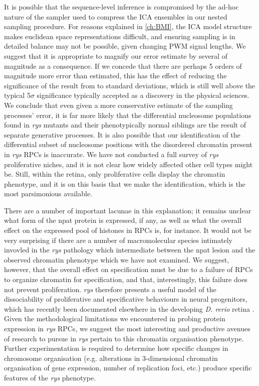 It is possible that the sequence-level inference is compromised by the ad-hoc nature of the sampler used to compress the ICA ensembles in our nested sampling procedure. For reasons explained in \autoref{ch:BMI}, the ICA model structure makes euclidean space representations difficult, and ensuring sampling is in detailed balance may not be possible, given changing PWM signal lengths. We suggest that it is appropriate to magnify our error estimate by several of magnitude as a consequence. If we concede that there are perhaps 5 orders of magnitude more error than estimated, this has the effect of reducing the significance of the result from to standard deviations, which is still well above the typical 5$\sigma$ significance typically accepted as a discovery in the physical sciences. We conclude that even given a more conservative estimate of the sampling processes' error, it is far more likely that the differential nucleosome populations found in \textit{rys} mutants and their phenotypically normal siblings are the result of separate generative processes. It is also possible that our identification of the differential subset of nucleosome positions with the disordered chromatin present in \textit{rys} RPCs is inaccurate. We have not conducted a full survey of \textit{rys} proliferative niches, and it is not clear how widely affected other cell types might be. Still, within the retina, only proliferative cells display the chromatin phenotype, and it is on this basis that we make the identification, which is the most parsimonious available. 

There are a number of important lacunae in this explanation; it remains unclear what form of the npat protein is expressed, if any, as well as what the overall effect on the expressed pool of histones in RPCs is, for instance. It would not be very surprising if there are a number of macromolecular species intimately invovled in the \textit{rys} pathology which intermediate between the npat lesion and the observed chromatin phenotype which we have not examined. We suggest, however, that the overall effect on specification must be due to a failure of RPCs to organize chromatin for specification, and that, interestingly, this failure does not prevent proliferation. \textit{rys} therefore presents a useful model of the dissociability of proliferative and specificative behaviours in neural progenitors, which has recently been documented elsewhere in the developing \textit{D. rerio} retina \cite{Engerer2017}. Given the methodological limitations we encountered in probing protein expression in \textit{rys} RPCs, we suggest the most interesting and productive avenues of research to pursue in \textit{rys} pertain to this chromatin organisation phenotype.  Further experimentation is required to determine how specific changes in chromosome organisation (e.g. alterations in 3-dimensional chromatin organisation of gene expression, number of replication foci, etc.) produce specific features of the \textit{rys} phenotype. 


